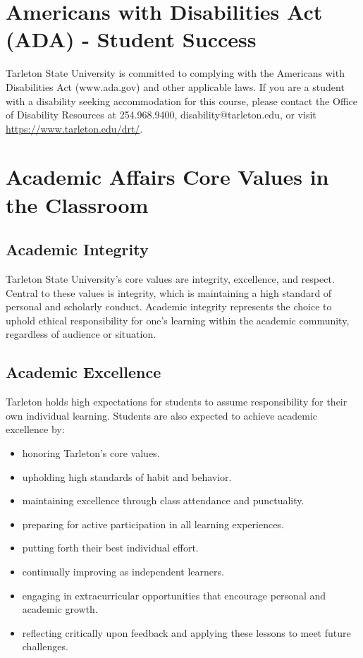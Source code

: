 \documentclass[10pt]{article}
\begin{document}
\section*{Americans with Disabilities Act (ADA) - Student Success}
\label{sec:org0ac16f4}

Tarleton State University is committed to complying with the Americans with Disabilities Act (www.ada.gov) and other applicable laws. If you are a student with a disability seeking accommodation for this course, please contact the Office of Disability Resources at 254.968.9400, disability@tarleton.edu, or visit \url{https://www.tarleton.edu/drt/}.  

\section*{Academic Affairs Core Values in the Classroom}
\label{sec:org7446152}

\subsection*{Academic Integrity}
\label{sec:org17e8ca1}
Tarleton State University's core values are integrity, excellence, and respect. Central to these values is integrity, which is maintaining a high standard of personal and scholarly conduct. Academic integrity represents the choice to uphold ethical responsibility for one’s learning within the academic community, regardless of audience or situation.

\subsection*{Academic Excellence}
\label{sec:org4f7c574}
Tarleton holds high expectations for students to assume responsibility for their own individual learning.  Students are also expected to achieve academic excellence by:
\begin{itemize}
\item honoring Tarleton’s core values.
\item upholding high standards of habit and behavior.
\item maintaining excellence through class attendance and punctuality.
\item preparing for active participation in all learning experiences.
\item putting forth their best individual effort.
\item continually improving as independent learners.
\item engaging in extracurricular opportunities that encourage personal and academic growth.
\item reflecting critically upon feedback and applying these lessons to meet future challenges.
\end{itemize}
\end{document}
